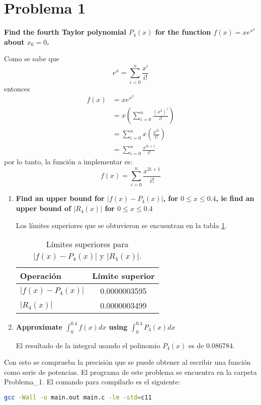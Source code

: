 \section*{Problema 1}
\textbf{Find the fourth Taylor polynomial $P_4(x)$ for the function $f (x) = xe^{x^2}$ about $x_0 = 0$.}

Como se sabe que
\begin{equation*}
    e^x= \sum_{i=0}^n \frac{x^i}{i!}
\end{equation*}
entonces
\begin{align*}
    f(x) & =xe^{x^2}                                       \\
         & =x \left(\sum_{i=0}^n \frac{(x^2)^i}{i!}\right) \\
         & =  \sum_{i=0}^n x\left(\frac{x^{2i}}{i!}\right) \\
         & = \sum_{i=0}^n \frac{x^{2i+1}}{i!}
\end{align*}
por lo tanto, la función a implementar es:
\begin{equation*}
    f(x)= \sum_{i=0}^n \frac{x^{2i+1}}{i!}
\end{equation*}
\begin{enumerate}
    \item \textbf{Find an upper bound for $|f (x)-P_4 (x)|$, for $0 \leq x \leq 0.4$, ie find an upper bound of $|R_4 (x)|$ for $0 \leq x \leq 0.4$}

          Los límites superiores que se obtuvieron se encuentran en la tabla \ref{table:problema1}.
          \begin{table}[H]
              \centering
              \begin{tabular}{lc} \hline
                  \textbf{Operación} & \textbf{Límite superior} \\ \hline
                  $|f(x)-P_4(x)|$    & 0.0000003595             \\
                  $|R_4(x)|$         & 0.0000003499             \\ \hline
              \end{tabular}
              \caption{Límites superiores para $|f(x)-P_4(x)|$ y $|R_4(x)|$.}
              \label{table:problema1}
          \end{table}
    \item \textbf{Approximate $\int_0^{0.4} f(x)dx$ using $\int_0^{0.4} P_4(x)dx$}

          El resultado de la integral usando el polinomio $P_4(x)$ es de 0.086784.
\end{enumerate}
Con esto se comprueba la precisión que se puede obtener al escribir una función como serie de potencias.
El programa de este problema se encuentra en la carpeta \textcolor{citecolor}{Problema\_1}. El comando para compilarlo es el siguiente:

\begin{lstlisting}[language=bash]
    gcc -Wall -o main.out main.c -lm -std=c11
\end{lstlisting}

